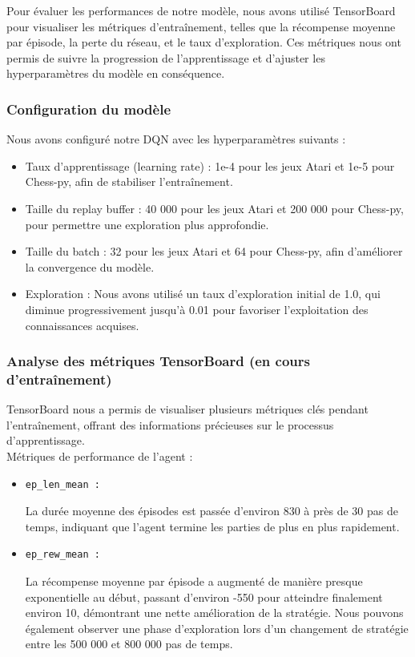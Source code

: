 \documentclass{article}
\begin{document}
\quad Pour évaluer les performances de notre modèle, nous avons utilisé TensorBoard pour visualiser les métriques d'entraînement, telles que la récompense moyenne par épisode, la perte du réseau, et le taux d'exploration. Ces métriques nous ont permis de suivre la progression de l'apprentissage et d'ajuster les hyperparamètres du modèle en conséquence.

    \subsubsection{Configuration du modèle}

    \quad Nous avons configuré notre DQN avec les hyperparamètres suivants :
    \begin{itemize} 
        \item Taux d'apprentissage (learning rate) : 1e-4 pour les jeux Atari et 1e-5 pour Chess-py, afin de stabiliser l'entraînement.
        \item Taille du replay buffer : 40 000 pour les jeux Atari et 200 000 pour Chess-py, pour permettre une exploration plus approfondie.
        \item Taille du batch : 32 pour les jeux Atari et 64 pour Chess-py, afin d'améliorer la convergence du modèle.
        \item Exploration : Nous avons utilisé un taux d'exploration initial de 1.0, qui diminue progressivement jusqu'à 0.01 pour favoriser l'exploitation des connaissances acquises.
    \end{itemize}

    \subsubsection{Analyse des métriques TensorBoard (en cours d'entraînement)}

    \quad TensorBoard nous a permis de visualiser plusieurs métriques clés pendant l'entraînement, offrant des informations précieuses sur le processus d'apprentissage.\\

    Métriques de performance de l'agent :
    \begin{itemize} 
        \item \begin{verbatim}ep_len_mean :\end{verbatim}La durée moyenne des épisodes est passée d'environ 830 à près de 30 pas de temps, indiquant que l'agent termine les parties de plus en plus rapidement.
        \item \begin{verbatim}ep_rew_mean :\end{verbatim}La récompense moyenne par épisode a augmenté de manière presque exponentielle au début, passant d'environ -550 pour atteindre finalement environ 10, démontrant une nette amélioration de la stratégie. Nous pouvons également observer une phase d'exploration lors d'un changement de stratégie entre les 500 000 et 800 000 pas de temps.
    \end{itemize}
\end{document}
